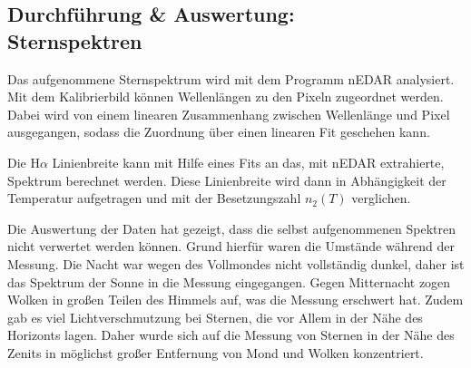 \subsection{Durchführung \& Auswertung:\\Sternspektren} \label{sec:d-a-sternspektren}
Das aufgenommene Sternspektrum wird mit dem Programm nEDAR analysiert.
Mit dem Kalibrierbild können Wellenlängen zu den Pixeln zugeordnet werden.
Dabei wird von einem linearen Zusammenhang zwischen Wellenlänge und Pixel ausgegangen, sodass die Zuordnung über einen linearen Fit geschehen kann.

Die H$\alpha $ Linienbreite kann mit Hilfe eines Fits an das, mit nEDAR extrahierte, Spektrum berechnet werden.
Diese Linienbreite wird dann in Abhängigkeit der Temperatur aufgetragen und mit der Besetzungszahl $n_2\left(T\right)$ verglichen.

Die Auswertung der Daten hat gezeigt, dass die selbst aufgenommenen Spektren nicht verwertet werden können.
Grund hierfür waren die Umstände während der Messung.
Die Nacht war wegen des Vollmondes nicht vollständig dunkel, daher ist das Spektrum der Sonne in die Messung eingegangen.
Gegen Mitternacht zogen Wolken in großen Teilen des Himmels auf, was die Messung erschwert hat.
Zudem gab es viel Lichtverschmutzung bei Sternen, die vor Allem in der Nähe des Horizonts lagen.
Daher wurde sich auf die Messung von Sternen in der Nähe des Zenits in möglichst großer Entfernung von Mond und Wolken konzentriert.

